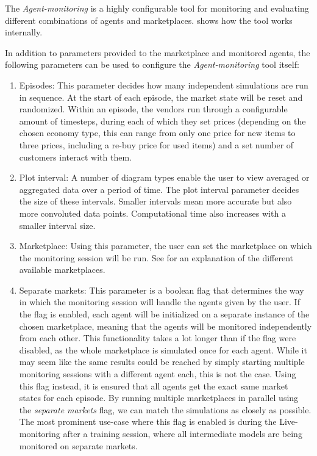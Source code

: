 The \emph{Agent-monitoring} is a highly configurable tool for monitoring and evaluating different combinations of agents and marketplaces.  shows how the tool works internally.

In addition to parameters provided to the marketplace and monitored agents, the following parameters can be used to configure the \emph{Agent-monitoring} tool itself:

\begin{enumerate}
	\item Episodes: This parameter decides how many independent simulations are run in sequence. At the start of each episode, the market state will be reset and randomized. Within an episode, the vendors run through a configurable amount of timesteps, during each of which they set prices (depending on the chosen economy type, this can range from only one price for new items to three prices, including a re-buy price for used items) and a set number of customers interact with them.
	\item Plot interval: A number of diagram types enable the user to view averaged or aggregated data over a period of time. The plot interval parameter decides the size of these intervals. Smaller intervals mean more accurate but also more convoluted data points. Computational time also increases with a smaller interval size.
	\item Marketplace: Using this parameter, the user can set the marketplace on which the monitoring session will be run. See  for an explanation of the different available marketplaces.
	\item Separate markets: This parameter is a boolean flag that determines the way in which the monitoring session will handle the agents given by the user. If the flag is enabled, each agent will be initialized on a separate instance of the chosen marketplace, meaning that the agents will be monitored independently from each other. This functionality takes a lot longer than if the flag were disabled, as the whole marketplace is simulated once for each agent. While it may seem like the same results could be reached by simply starting multiple monitoring sessions with a different agent each, this is not the case. Using this flag instead, it is ensured that all agents get the exact same market states for each episode. By running multiple marketplaces in parallel using the \emph{separate markets} flag, we can match the simulations as closely as possible. The most prominent use-case where this flag is enabled is during the Live-monitoring after a training session, where all intermediate models are being monitored on separate markets.


\end{enumerate}
